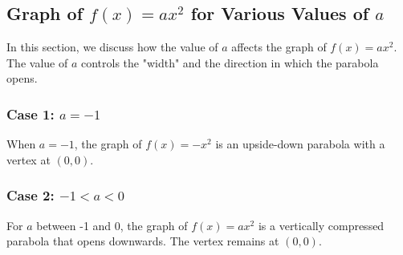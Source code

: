 \begin{center}
\end{center}

\subsection*{Graph of \( f(x) = ax^2 \) for Various Values of \( a \)}

In this section, we discuss how the value of \( a \) affects the graph of \( f(x) = ax^2 \). The value of \( a \) controls the "width" and the direction in which the parabola opens.

\subsubsection*{Case 1: \( a = -1 \)}

When \( a = -1 \), the graph of \( f(x) = -x^2 \) is an upside-down parabola with a vertex at \( (0, 0) \).

\begin{center}
\end{center}

\subsubsection*{Case 2: \( -1 < a < 0 \)}

For \( a \) between -1 and 0, the graph of \( f(x) = ax^2 \) is a vertically compressed parabola that opens downwards. The vertex remains at \( (0, 0) \).

\begin{center}
\end{center}

